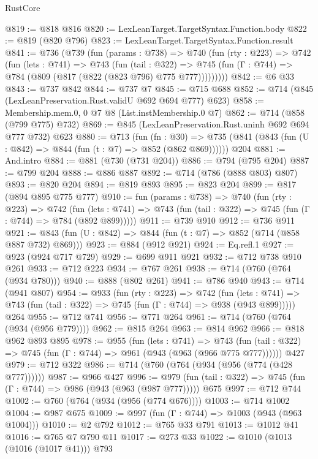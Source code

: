\begin{lexlean}{RustCore}
\begin{coremodule}
@819 := @818 @816
@820 := LexLeanTarget.TargetSyntax.Function.body
@822 := @819 (@820 @796)
@823 := LexLeanTarget.TargetSyntax.Function.result
@841 := @736
    (@739
      (fun (params : @738) =>
      @740
        (fun (rty : @223) =>
        @742
          (fun (lets : @741) =>
          @743
            (fun (tail : @322) =>
            @745 (fun (Γ : @744) => @784 (@809 (@817 (@822 (@823 @796) @775 @777)))))))))
@842 := @6 @33
@843 := @737 @842
@844 := @737 @7
@845 := @715 @688
@852 := @714 (@845 (LexLeanPreservation.Rust.validU @692 @694 @777) @623)
@858 := Membership.mem.{0, 0} @7 @8 (List.instMembership.{0} @7)
@862 := @714 (@858 (@799 @775) @732)
@869 := @845 (LexLeanPreservation.Rust.uninh @692 @694 @777 @732) @623
@880 := @713
    (fun (fn : @30) =>
    @735 (@841 (@843 (fun (U : @842) => @844 (fun (t : @7) => @852 (@862 @869))))))
    @204
@881 := And.intro
@884 := @881 (@730 (@731 @204))
@886 := @794 (@795 @204)
@887 := @799 @204
@888 := @886 @887
@892 := @714 (@786 (@888 @803) @807)
@893 := @820 @204
@894 := @819 @893
@895 := @823 @204
@899 := @817 (@894 @895 @775 @777)
@910 := fun (params : @738) =>
  @740
    (fun (rty : @223) =>
    @742
      (fun (lets : @741) => @743 (fun (tail : @322) => @745 (fun (Γ : @744) => @784 (@892 @899)))))
@911 := @739 @910
@912 := @736 @911
@921 := @843 (fun (U : @842) => @844 (fun (t : @7) => @852 (@714 (@858 @887 @732) @869)))
@923 := @884 (@912 @921)
@924 := Eq.refl.{1}
@927 := @923 (@924 @717 @729)
@929 := @699 @911 @921
@932 := @712 @738 @910 @261
@933 := @712 @223
@934 := @767 @261
@938 := @714 (@760 (@764 (@934 @780)))
@940 := @888 (@802 @261)
@941 := @786 @940
@943 := @714 (@941 @807)
@954 := @933
    (fun (rty : @223) =>
    @742
      (fun (lets : @741) => @743 (fun (tail : @322) => @745 (fun (Γ : @744) => @938 (@943 @899)))))
    @264
@955 := @712 @741
@956 := @771 @264
@961 := @714 (@760 (@764 (@934 (@956 @779))))
@962 := @815 @264
@963 := @814 @962
@966 := @818 @962 @893 @895
@978 := @955
    (fun (lets : @741) =>
    @743 (fun (tail : @322) => @745 (fun (Γ : @744) => @961 (@943 (@963 (@966 @775 @777))))))
    @427
@979 := @712 @322
@986 := @714 (@760 (@764 (@934 (@956 (@774 (@428 @777))))))
@987 := @966 @427
@996 := @979 (fun (tail : @322) => @745 (fun (Γ : @744) => @986 (@943 (@963 (@987 @777))))) @675
@997 := @712 @744
@1002 := @760 (@764 (@934 (@956 (@774 @676))))
@1003 := @714 @1002
@1004 := @987 @675
@1009 := @997 (fun (Γ : @744) => @1003 (@943 (@963 @1004)))
@1010 := @2 @792
@1012 := @765 @33 @791
@1013 := @1012 @41
@1016 := @765 @7 @790 @11
@1017 := @273 @33
@1022 := @1010 (@1013 (@1016 (@1017 @41))) @793

\end{coremodule}
\end{lexlean}
